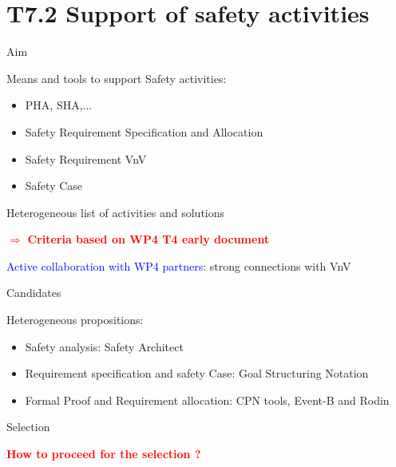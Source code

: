 
\section{T7.2 Support of safety activities}

\begin{frame}{Aim}

   Means and tools to support Safety activities:
 
   \begin{itemize}
   \item PHA, SHA,...
   \item Safety Requirement Specification and Allocation
   \item Safety Requirement VnV
   \item Safety Case
   \end{itemize}
   
   
   

\pause   
   
Heterogeneous list of activities and solutions
  
  \textcolor{red}{$ \Rightarrow $ \bf{Criteria based on WP4 T4 early document} } 

\pause   
   
   \textcolor{blue}{Active collaboration with WP4 partners}:  strong connections with VnV
   
\end{frame}



\begin{frame}{Candidates}

   Heterogeneous propositions:
 
   \begin{itemize}
   \item Safety analysis: Safety Architect
   \item Requirement specification and safety Case: Goal Structuring Notation
   \item Formal Proof and Requirement allocation: CPN tools, Event-B and Rodin
   \end{itemize}
   
   
\end{frame}



\begin{frame}{Selection}

   \textbf{\textcolor{red}{How to proceed for the selection ?}}
 
 
   
   
\end{frame}

